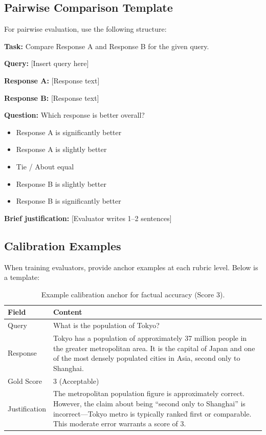 \subsection{Pairwise Comparison Template}

For pairwise evaluation, use the following structure:

\begin{tcolorbox}[colback=gray!5, colframe=gray!50, title=Pairwise Comparison Instructions]
\textbf{Task:} Compare Response A and Response B for the given query.

\textbf{Query:} [Insert query here]

\textbf{Response A:} [Response text]

\textbf{Response B:} [Response text]

\textbf{Question:} Which response is better overall?

\begin{itemize}
    \item[$\square$] Response A is significantly better
    \item[$\square$] Response A is slightly better
    \item[$\square$] Tie / About equal
    \item[$\square$] Response B is slightly better
    \item[$\square$] Response B is significantly better
\end{itemize}

\textbf{Brief justification:} [Evaluator writes 1--2 sentences]
\end{tcolorbox}

\subsection{Calibration Examples}

When training evaluators, provide anchor examples at each rubric level. Below is a template:

\begin{table}[h]
\centering
\caption{Example calibration anchor for factual accuracy (Score 3).}
\label{tab:calibration-example}
\begin{tabular}{@{}lp{9cm}@{}}
\toprule
\textbf{Field} & \textbf{Content} \\
\midrule
Query & What is the population of Tokyo? \\
Response & Tokyo has a population of approximately 37 million people in the greater metropolitan area. It is the capital of Japan and one of the most densely populated cities in Asia, second only to Shanghai. \\
Gold Score & 3 (Acceptable) \\
Justification & The metropolitan population figure is approximately correct. However, the claim about being ``second only to Shanghai'' is incorrect---Tokyo metro is typically ranked first or comparable. This moderate error warrants a score of 3. \\
\bottomrule
\end{tabular}
\end{table}
